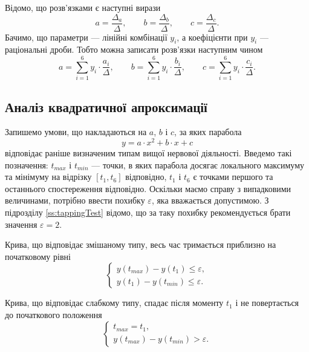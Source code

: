 Відомо, що розв’язками є наступні вирази
\begin{equation*}
  a = \frac{\Delta_a}{\Delta},\qquad
  b = \frac{\Delta_b}{\Delta},\qquad
  c = \frac{\Delta_c}{\Delta}.
\end{equation*}
Бачимо, що параметри --- лінійні комбінації $y_i$, а коефіцієнти при $y_i$ ---
раціональні дроби.
Тобто можна записати розв’язки наступним чином
\begin{equation*}
  a = \sum_{i=1}^{6} y_i \cdot \frac{a_i}{\Delta},\qquad
  b = \sum_{i=1}^{6} y_i \cdot \frac{b_i}{\Delta},\qquad
  c = \sum_{i=1}^{6} y_i \cdot \frac{c_i}{\Delta}.
\end{equation*}

\subsection{Аналіз квадратичної апроксимації}

Запишемо умови, що накладаються на $a$, $b$ і $c$, за яких парабола
\begin{equation*}
  y = a \cdot x^2 + b \cdot x + c
\end{equation*}
відповідає раніше визначеним типам вищої нервової діяльності.
Введемо такі позначення: $t_{max}$ і $t_{min}$ --- точки, в яких парабола
досягає локального максимуму та мінімуму на відрізку $\left[ t_1, t_6 \right]$
відповідно, $t_1$ і $t_6$ є точками першого та останнього спостереження
відповідно.
Оскільки маємо справу з випадковими величинами, потрібно ввести похибку
$\varepsilon$, яка вважається допустимою.
З підрозділу \ref{ss:tappingTest} відомо, що за таку похибку рекомендується
брати значення $\varepsilon = 2$. \cite{Ilin:2001}

Крива, що відповідає змішаному типу, весь час тримається приблизно на
початковому рівні
\begin{equation*}
  \begin{cases}
    y\left( t_{max} \right) - y\left( t_1 \right) \le \varepsilon, \\
    y\left( t_1 \right) - y\left( t_{min} \right) \le \varepsilon.
  \end{cases}
\end{equation*}

Крива, що відповідає слабкому типу, спадає після моменту $t_1$
і не повертається до початкового положення
\begin{equation*}
  \begin{cases}
    t_{max} = t_1, \\
    y\left( t_{max} \right) - y\left( t_{min} \right) > \varepsilon.
  \end{cases}
\end{equation*}

